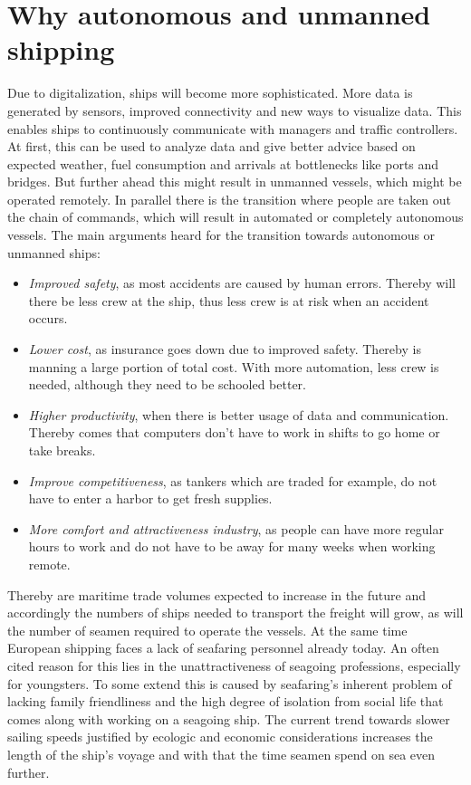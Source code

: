 \section{Why autonomous and unmanned shipping}
Due to digitalization, ships will become more sophisticated. More data is generated by sensors, improved connectivity and new ways to visualize data. This enables ships to continuously communicate with managers and traffic controllers. At first, this can be used to analyze data and give better advice based on expected weather, fuel consumption and arrivals at bottlenecks like ports and bridges.
But further ahead this might result in unmanned vessels, which might be operated remotely. In parallel there is the transition where people are taken out the chain of commands, which will result in automated or completely autonomous vessels. The main arguments heard for the transition towards autonomous or unmanned ships:
\begin{itemize}
	\item \emph{Improved safety}, as most accidents are caused by human errors. Thereby will there be less crew at the ship, thus less crew is at risk when an accident occurs.
	\item \emph{Lower cost}, as insurance goes down due to improved safety. Thereby is manning a large portion of total cost. With more automation, less crew is needed, although they need to be schooled better.
	\item \emph{Higher productivity}, when there is better usage of data and communication. Thereby comes that computers don't have to work in shifts to go home or take breaks.
	\item \emph{Improve competitiveness}, as tankers which are traded for example, do not have to enter a harbor to get fresh supplies.
	\item \emph{More comfort and attractiveness industry}, as people can have more regular hours to work and do not have to be away for many weeks when working remote.
\end{itemize}
Thereby are maritime trade volumes expected to increase in the future and accordingly the numbers of ships needed to transport the freight will grow, as will the number of seamen required to operate the vessels. At the same time European shipping faces a lack of seafaring personnel already today. An often cited reason for this lies in the unattractiveness of seagoing professions, especially for youngsters. To some extend this is caused by seafaring’s inherent problem of lacking family friendliness and the high degree of isolation from social life that comes along with working on a seagoing ship. The current trend towards slower sailing speeds justified by ecologic and economic considerations increases the length of the ship’s voyage and with that the time seamen spend on sea even further.

